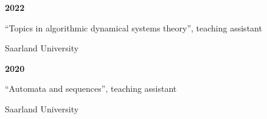 \documentclass{article}
\begin{document}
	\noindent\begin{minipage}{0.3\textwidth}
		\hspace{0.5cm} \textbf{
			2022}
	\end{minipage}
	\begin{minipage}{0.7\textwidth}
		``Topics in algorithmic dynamical systems theory'', teaching assistant 
		
		Saarland University
	\end{minipage}
	
	\vspace{0.3cm}
	
	\noindent\begin{minipage}{0.3\textwidth}
		\hspace{0.5cm} \textbf{
			2020}
	\end{minipage}
	\begin{minipage}{0.7\textwidth}
		``Automata and sequences'', teaching assistant 
		
		Saarland University
	\end{minipage}
	
	\vspace*{0.4cm}
\end{document}
